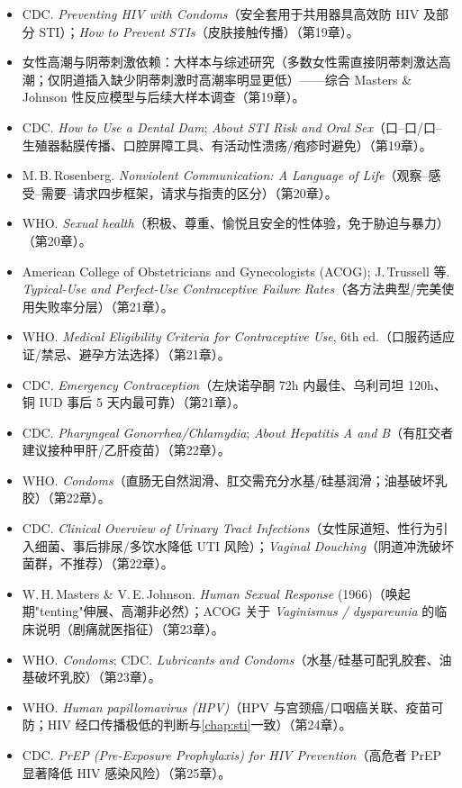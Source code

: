 \begin{itemize}[leftmargin=2em]
  \item CDC. \emph{Preventing HIV with Condoms}（安全套用于共用器具高效防 HIV 及部分 STI）；\emph{How to Prevent STIs}（皮肤接触传播）（第19章）。
  \item 女性高潮与阴蒂刺激依赖：大样本与综述研究（多数女性需直接阴蒂刺激达高潮；仅阴道插入缺少阴蒂刺激时高潮率明显更低）——综合 Masters \& Johnson 性反应模型与后续大样本调查（第19章）。
  \item CDC. \emph{How to Use a Dental Dam}; \emph{About STI Risk and Oral Sex}（口--口/口--生殖器黏膜传播、口腔屏障工具、有活动性溃疡/疱疹时避免）（第19章）。
  \item M.\,B.\,Rosenberg. \emph{Nonviolent Communication: A Language of Life}（观察--感受--需要--请求四步框架，请求与指责的区分）（第20章）。
  \item WHO. \emph{Sexual health}（积极、尊重、愉悦且安全的性体验，免于胁迫与暴力）（第20章）。
  \item American College of Obstetricians and Gynecologists (ACOG); J.\,Trussell 等. \emph{Typical-Use and Perfect-Use Contraceptive Failure Rates}（各方法典型/完美使用失败率分层）（第21章）。
  \item WHO. \emph{Medical Eligibility Criteria for Contraceptive Use}, 6th ed.（口服药适应证/禁忌、避孕方法选择）（第21章）。
  \item CDC. \emph{Emergency Contraception}（左炔诺孕酮 72h 内最佳、乌利司坦 120h、铜 IUD 事后 5 天内最可靠）（第21章）。
  \item CDC. \emph{Pharyngeal Gonorrhea/Chlamydia}; \emph{About Hepatitis A and B}（有肛交者建议接种甲肝/乙肝疫苗）（第22章）。
  \item WHO. \emph{Condoms}（直肠无自然润滑、肛交需充分水基/硅基润滑；油基破坏乳胶）（第22章）。
  \item CDC. \emph{Clinical Overview of Urinary Tract Infections}（女性尿道短、性行为引入细菌、事后排尿/多饮水降低 UTI 风险）；\emph{Vaginal Douching}（阴道冲洗破坏菌群，不推荐）（第22章）。
  \item W.\,H.\,Masters \& V.\,E.\,Johnson. \emph{Human Sexual Response} (1966)（唤起期"tenting"伸展、高潮非必然）；ACOG 关于 \emph{Vaginismus / dyspareunia} 的临床说明（剧痛就医指征）（第23章）。
  \item WHO. \emph{Condoms}; CDC. \emph{Lubricants and Condoms}（水基/硅基可配乳胶套、油基破坏乳胶）（第23章）。
  \item WHO. \emph{Human papillomavirus (HPV)}（HPV 与宫颈癌/口咽癌关联、疫苗可防；HIV 经口传播极低的判断与\ref{chap:sti}一致）（第24章）。
  \item CDC. \emph{PrEP (Pre-Exposure Prophylaxis) for HIV Prevention}（高危者 PrEP 显著降低 HIV 感染风险）（第25章）。

\end{itemize}

